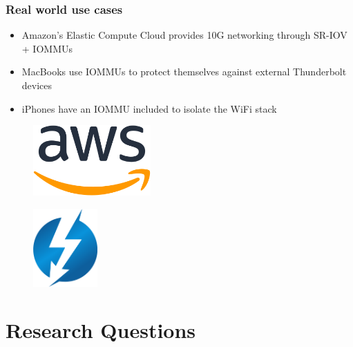 \begin{frame}
    \frametitle{Real world use cases}

    \begin{itemize}
        \item Amazon's Elastic Compute Cloud provides 10G networking through
            SR-IOV + IOMMUs
        \item MacBooks use IOMMUs to protect themselves against external
            Thunderbolt devices
        \item iPhones have an IOMMU included to isolate the WiFi stack
    \end{itemize}

    \vspace{3em}

    \begin{center}
        \begin{minipage}{0.35\textwidth}
            \begin{figure}
                \includegraphics[width=0.4\textwidth]{pics/aws.png}
            \end{figure}
        \end{minipage}%
        \begin{minipage}{0.35\textwidth}
            \begin{figure}
                \includegraphics[width=0.22\textwidth]{pics/thunderbolt.png}
            \end{figure}
        \end{minipage}
    \end{center}
\end{frame}


\section{Research Questions}

